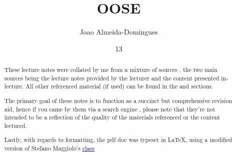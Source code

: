 \documentclass[english,course]{Notes}
\title{OOSE}
\author{Joao Almeida-Domingues}
\date{13}{01}{2020}
\begin{document}

\begin{abstract}
	\par{These lecture notes were collated by me from a mixture of sources , the two main sources being the lecture notes provided by the lecturer and the 
content presented in-lecture. All other referenced material (if used) can be found in the  and  sections.}
	\par{The primary goal of these notes is to function as a succinct but comprehensive revision aid, hence if you came by them via a search engine , please note 
that they're not intended to be a reflection of the quality of the materials referenced or the content lectured.}
	\par{Lastly, with regards to formatting, the pdf doc was typeset in \LaTeX , using a modified version of Stefano Maggiolo's \href{http://blog.poormansmath.net/
latex-class-for-lecture-notes/}{\underline{\textcolor{blue}{class}}}}
\end{abstract}
\newpage


%
%
%










\newpage
\nocite{*}
\printbibliography

\end{document}
